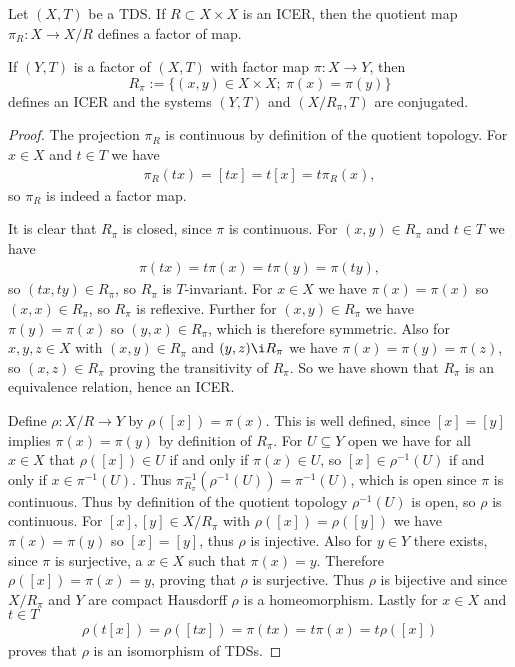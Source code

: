 \begin{proposition}
	\label{prop:factorsAndIcers}
	Let $(X, T)$ be a TDS. If $R \subset X \times X$ is an ICER, then the quotient map $\pi_R: X \to X/R$ defines a factor of map.
	
	If $(Y, T)$ is a factor of $(X, T)$ with factor map $\pi: X \to Y$, then
	\begin{equation*}
		R_\pi := \{(x, y) \in X \times X;\ \pi(x) = \pi(y)\}
	\end{equation*}
	defines an ICER and the systems $(Y, T)$ and $(X/R_\pi, T)$ are conjugated.
\end{proposition}
\begin{proof}
	The projection $\pi_R$ is continuous by definition of the quotient topology. For $x \in X$ and $t \in T$ we have
	\begin{align*}
		\pi_R(tx) = [tx] = t[x] = t\pi_R(x),
	\end{align*}
	so $\pi_R$ is indeed a factor map.
	
	It is clear that $R_\pi$ is closed, since $\pi$ is continuous. For $(x, y) \in R_\pi$ and $t \in T$ we have
	\begin{align*}
		\pi(tx) = t\pi(x) = t\pi(y) = \pi(ty),
 	\end{align*}
 	so $(tx, ty) \in R_\pi$, so $R_\pi$ is $T$-invariant. For $x \in X$ we have $\pi(x) = \pi(x)$ so $(x, x) \in R_\pi$, so $R_\pi$ is reflexive. Further for $(x, y) \in R_\pi$ we have $\pi(y) = \pi(x)$ so $(y, x) \in R_\pi$, which is therefore symmetric. Also for $x, y, z \in X$ with $(x, y) \in R_\pi$ and $(y, z) \i R_\pi$ we have $\pi(x) = \pi(y) = \pi(z)$, so $(x, z) \in R_\pi$ proving the transitivity of $R_\pi$. So we have shown that $R_\pi$ is an equivalence relation, hence an ICER.
 	
 	Define $\rho: X/R \to Y$ by $\rho([x]) = \pi(x)$. This is well defined, since $[x] = [y]$ implies $\pi(x) = \pi(y)$ by definition of $R_\pi$. For $U \subseteq Y$ open we have for all $x \in X$ that $\rho([x]) \in U$ if and only if $\pi(x) \in U$, so $[x] \in \rho^{-1}(U)$ if and only if $x \in \pi^{-1}(U)$. Thus $\pi_{R_\pi}^{-1}(\rho^{-1}(U)) = \pi^{-1}(U)$, which is open since $\pi$ is continuous. Thus by definition of the quotient topology $\rho^{-1}(U)$ is open, so $\rho$ is continuous. For $[x], [y] \in X/R_\pi$ with $\rho([x]) = \rho([y])$ we have $\pi(x) = \pi(y)$ so $[x] = [y]$, thus $\rho$ is injective. Also for $y \in Y$ there exists, since $\pi$ is surjective, a $x \in X$ such that $\pi(x) = y$. Therefore $\rho([x]) = \pi(x) = y$, proving that $\rho$ is surjective. Thus $\rho$ is bijective and since $X/R_\pi$ and $Y$ are compact Hausdorff $\rho$ is a homeomorphism. Lastly for $x \in X$ and $t \in T$
 	\begin{align*}
 		\rho(t[x]) = \rho([tx]) = \pi(tx) = t\pi(x) = t\rho([x])
 	\end{align*}
 	proves that $\rho$ is an isomorphism of TDSs.
\end{proof}

